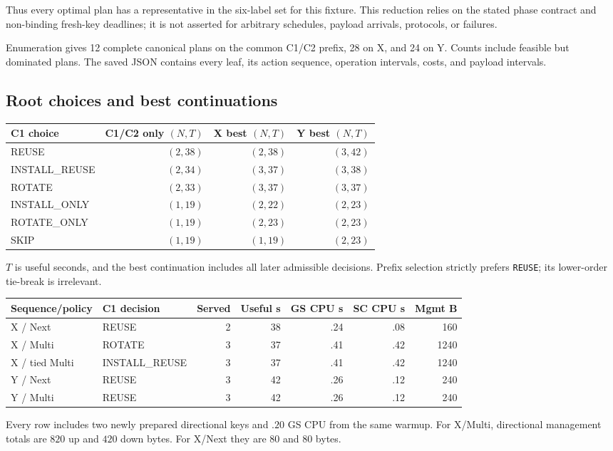 \documentclass[11pt,a4paper]{article}
\newcommand{\act}[1]{\texttt{#1}}
\begin{document}
Thus every optimal plan has a representative in the six-label set for this fixture. This reduction relies on the stated phase contract and non-binding fresh-key deadlines; it is not asserted for arbitrary schedules, payload arrivals, protocols, or failures.

Enumeration gives 12 complete canonical plans on the common C1/C2 prefix, 28 on X, and 24 on Y. Counts include feasible but dominated plans. The saved JSON contains every leaf, its action sequence, operation intervals, costs, and payload intervals.

\subsection{Root choices and best continuations}
\begin{center}
\begin{tabular}{@{}lrrr@{}}
\toprule
C1 choice & C1/C2 only $(N,T)$ & X best $(N,T)$ & Y best $(N,T)$\\
\midrule
REUSE & $(2,38)$ & $(2,38)$ & $(3,42)$\\
INSTALL\_REUSE & $(2,34)$ & $(3,37)$ & $(3,38)$\\
ROTATE & $(2,33)$ & $(3,37)$ & $(3,37)$\\
INSTALL\_ONLY & $(1,19)$ & $(2,22)$ & $(2,23)$\\
ROTATE\_ONLY & $(1,19)$ & $(2,23)$ & $(2,23)$\\
SKIP & $(1,19)$ & $(1,19)$ & $(2,23)$\\
\bottomrule
\end{tabular}
\end{center}
$T$ is useful seconds, and the best continuation includes all later admissible decisions. Prefix selection strictly prefers \act{REUSE}; its lower-order tie-break is irrelevant.

\begin{center}
\begin{tabular}{@{}llrrrrr@{}}
\toprule
Sequence/policy & C1 decision & Served & Useful s & GS CPU s & SC CPU s & Mgmt B\\
\midrule
X / Next & REUSE & 2 & 38 & .24 & .08 & 160\\
X / Multi & ROTATE & 3 & 37 & .41 & .42 & 1240\\
X / tied Multi & INSTALL\_REUSE & 3 & 37 & .41 & .42 & 1240\\
Y / Next & REUSE & 3 & 42 & .26 & .12 & 240\\
Y / Multi & REUSE & 3 & 42 & .26 & .12 & 240\\
\bottomrule
\end{tabular}
\end{center}
Every row includes two newly prepared directional keys and $.20$ GS CPU from the same warmup. For X/Multi, directional management totals are $820$ up and $420$ down bytes. For X/Next they are $80$ and $80$ bytes.
\end{document}
